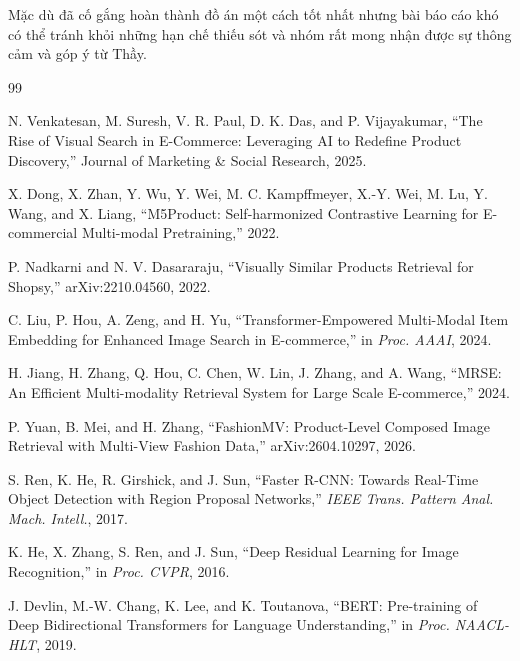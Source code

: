 \documentclass[10pt,conference]{IEEEtran}
\begin{document}
Mặc dù đã cố gắng hoàn thành đồ án một cách tốt nhất nhưng bài báo cáo khó có thể tránh khỏi những hạn chế thiếu sót và nhóm rất mong nhận được sự thông cảm và góp ý từ Thầy. 



\renewcommand{\refname}{Tài liệu tham khảo}
\balance

\begin{thebibliography}{99}

N. Venkatesan, M. Suresh, V. R. Paul, D. K. Das, and P. Vijayakumar,
``The Rise of Visual Search in E-Commerce: Leveraging AI to Redefine Product Discovery,''
Journal of Marketing \& Social Research, 2025.

X. Dong, X. Zhan, Y. Wu, Y. Wei, M. C. Kampffmeyer, X.-Y. Wei,
M. Lu, Y. Wang, and X. Liang,
``M5Product: Self-harmonized Contrastive Learning for E-commercial Multi-modal Pretraining,''
2022.

P. Nadkarni and N. V. Dasararaju,
``Visually Similar Products Retrieval for Shopsy,''
arXiv:2210.04560, 2022.

C. Liu, P. Hou, A. Zeng, and H. Yu,
``Transformer-Empowered Multi-Modal Item Embedding for Enhanced Image Search in E-commerce,''
in \emph{Proc. AAAI}, 2024.

H. Jiang, H. Zhang, Q. Hou, C. Chen, W. Lin, J. Zhang, and A. Wang,
``MRSE: An Efficient Multi-modality Retrieval System for Large Scale E-commerce,''
2024.

P. Yuan, B. Mei, and H. Zhang,
``FashionMV: Product-Level Composed Image Retrieval with Multi-View Fashion Data,''
arXiv:2604.10297, 2026.

S. Ren, K. He, R. Girshick, and J. Sun,
``Faster R-CNN: Towards Real-Time Object Detection with Region Proposal Networks,''
\emph{IEEE Trans. Pattern Anal. Mach. Intell.}, 2017.

K. He, X. Zhang, S. Ren, and J. Sun,
``Deep Residual Learning for Image Recognition,''
in \emph{Proc. CVPR}, 2016.

J. Devlin, M.-W. Chang, K. Lee, and K. Toutanova,
``BERT: Pre-training of Deep Bidirectional Transformers for Language Understanding,''
in \emph{Proc. NAACL-HLT}, 2019.


\end{thebibliography}
\end{document}
